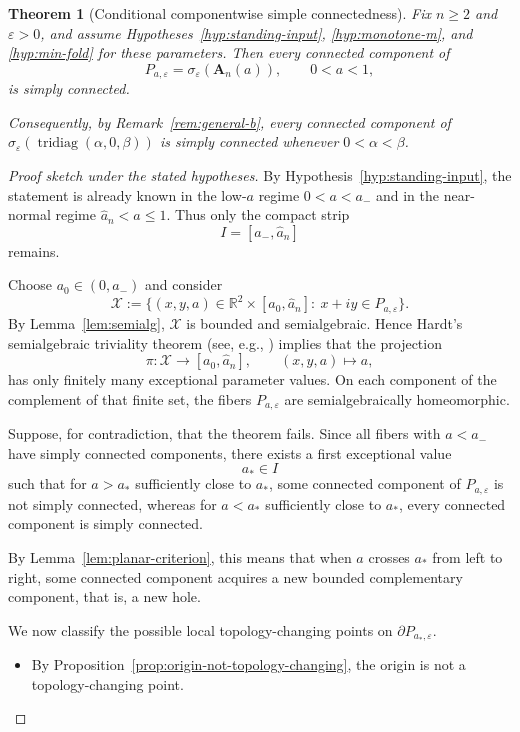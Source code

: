 \documentclass[11pt]{article}
\newtheorem{theorem}{Theorem}[section]
\DeclareMathOperator{\tridiag}{tridiag}
\newcommand{\R}{\mathbb{R}}
\begin{document}
\begin{theorem}[Conditional componentwise simple connectedness]\label{thm:main}
Fix \(n\ge 2\) and \(\varepsilon>0\), and assume Hypotheses~\ref{hyp:standing-input}, \ref{hyp:monotone-m}, and \ref{hyp:min-fold} for these parameters. Then every connected component of
\[
P_{a,\varepsilon}
=
\sigma_\varepsilon(\mathbf A_n(a)),
\qquad 0<a<1,
\]
is simply connected.

Consequently, by Remark~\ref{rem:general-b}, every connected component of \(\sigma_\varepsilon(\tridiag(\alpha,0,\beta))\) is simply connected whenever \(0<\alpha<\beta\).
\end{theorem}

\begin{proof}[Proof sketch under the stated hypotheses]
By Hypothesis~\ref{hyp:standing-input}, the statement is already known in the low-\(a\) regime \(0<a<a_-\) and in the near-normal regime \(\widehat a_n<a\le 1\). Thus only the compact strip
\[
I=[a_-,\widehat a_n]
\]
remains.

Choose \(a_0\in(0,a_-)\) and consider
\[
\mathcal X
:=
\{(x,y,a)\in \R^2\times [a_0,\widehat a_n]:\ x+iy\in P_{a,\varepsilon}\}.
\]
By Lemma~\ref{lem:semialg}, \(\mathcal X\) is bounded and semialgebraic. Hence Hardt's semialgebraic triviality theorem (see, e.g., \cite{BCR}) implies that the projection
\[
\pi:\mathcal X\to [a_0,\widehat a_n],\qquad (x,y,a)\mapsto a,
\]
has only finitely many exceptional parameter values. On each component of the complement of that finite set, the fibers \(P_{a,\varepsilon}\) are semialgebraically homeomorphic.

Suppose, for contradiction, that the theorem fails. Since all fibers with \(a<a_-\) have simply connected components, there exists a first exceptional value
\[
a_*\in I
\]
such that for \(a>a_*\) sufficiently close to \(a_*\), some connected component of \(P_{a,\varepsilon}\) is not simply connected, whereas for \(a<a_*\) sufficiently close to \(a_*\), every connected component is simply connected.

By Lemma~\ref{lem:planar-criterion}, this means that when \(a\) crosses \(a_*\) from left to right, some connected component acquires a new bounded complementary component, that is, a new hole.

We now classify the possible local topology-changing points on \(\partial P_{a_*,\varepsilon}\).

\begin{itemize}
\item By Proposition~\ref{prop:origin-not-topology-changing}, the origin is not a topology-changing point.


\end{itemize}
\end{proof}
\end{document}
